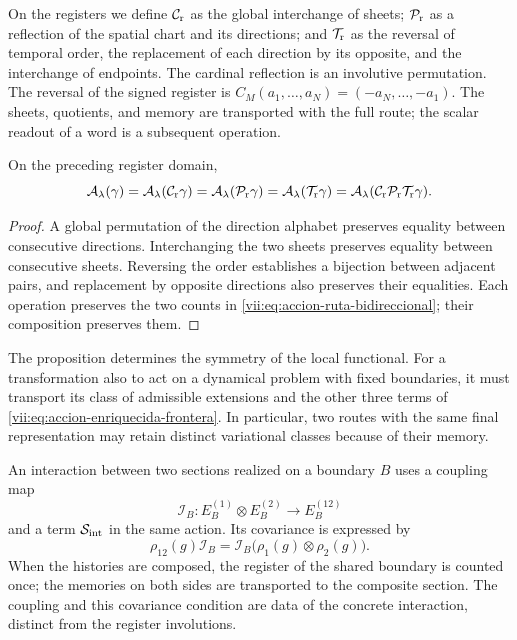 On the registers we define \(\mathcal C_{\rm r}\) as the global
interchange of sheets; \(\mathcal P_{\rm r}\) as a reflection of the spatial
chart and its directions; and \(\mathcal T_{\rm r}\) as the reversal
of temporal order, the replacement of each direction by its opposite, and the
interchange of endpoints. The cardinal reflection is an involutive permutation.
The reversal of the signed register is
\(C_M(a_1,\ldots,a_N)=(-a_N,\ldots,-a_1)\).
The sheets, quotients, and memory are transported with the full route;
the scalar readout of a word is a subsequent operation.

\begin{proposition}
\label{vii:prop:invariancia-ruta-bidireccional}
On the preceding register domain,
\[
 \mathcal A_\lambda(\gamma)
 =\mathcal A_\lambda(\mathcal C_{\rm r}\gamma)
 =\mathcal A_\lambda(\mathcal P_{\rm r}\gamma)
 =\mathcal A_\lambda(\mathcal T_{\rm r}\gamma)
 =\mathcal A_\lambda(\mathcal C_{\rm r}\mathcal P_{\rm r}
                              \mathcal T_{\rm r}\gamma).
\]
\end{proposition}
\begin{proof}
A global permutation of the direction alphabet preserves equality
between consecutive directions. Interchanging the two sheets preserves
equality between consecutive sheets. Reversing the order establishes a
bijection between adjacent pairs, and replacement by opposite directions
also preserves their equalities. Each operation preserves the two counts
in \eqref{vii:eq:accion-ruta-bidireccional}; their composition preserves them.
\end{proof}

The proposition determines the symmetry of the local functional. For a
transformation also to act on a dynamical problem with fixed boundaries,
it must transport its class of admissible extensions and the other three
terms of \eqref{vii:eq:accion-enriquecida-frontera}. In particular, two
routes with the same final representation may retain distinct variational
classes because of their memory.

An interaction between two sections realized on a boundary \(B\)
uses a coupling map
\[
 \mathcal I_B:E_B^{(1)}\otimes E_B^{(2)}\longrightarrow E_B^{(12)}
\]
and a term \(\mathcal S_{\rm int}\) in the same action. Its covariance
is expressed by
\[
 \rho_{12}(g)\mathcal I_B
 =\mathcal I_B\bigl(\rho_1(g)\otimes\rho_2(g)\bigr).
\]
When the histories are composed, the register of the shared boundary is counted
once; the memories on both sides are transported to the composite section.
The coupling and this covariance condition are data of the concrete
interaction, distinct from the register involutions.

